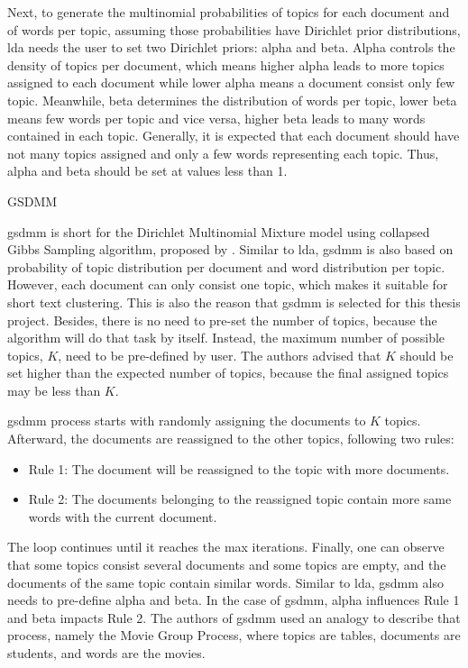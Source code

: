 \documentclass[a4paper,man,floatsintext,natbib,noextraspace]{apa6}
\makeatletter
\renewcommand{\subsubsection}{\@startsection{subsubsection}{3}
  {\z@}
  {\b@level@two@skip}
  {\e@level@two@skip}
  {\normalfont\normalsize\bfseries\itshape}}
\makeatother
\begin{document}
Next, to generate the multinomial probabilities of topics for each document and of words per topic, assuming those probabilities have Dirichlet prior distributions, \gls{lda} needs the user to set two Dirichlet priors: alpha and beta. Alpha controls the density of topics per document, which means higher alpha leads to more topics assigned to each document while lower alpha means a document consist only few topic. Meanwhile, beta determines the distribution of words per topic, lower beta means few words per topic and vice versa, higher beta leads to many words contained in each topic. Generally, it is expected that each document should have not many topics assigned and only a few words representing each topic. Thus, alpha and beta should be set at values less than 1. 

\subsubsection{GSDMM}

\gls{gsdmm} is short for the Dirichlet Multinomial Mixture model using collapsed Gibbs Sampling algorithm, proposed by \cite{yinDirichletMultinomialMixture2014}. Similar to \gls{lda}, \gls{gsdmm} is also based on probability of topic distribution per document and word distribution per topic. However, each document can only consist one topic, which makes it suitable for short text clustering. This is also the reason that \gls{gsdmm} is selected for this thesis project. Besides, there is no need to pre-set the number of topics, because the algorithm will do that task by itself. Instead, the maximum number of possible topics, $K$, need to be pre-defined by user. The authors advised that $K$ should be set higher than the expected number of topics, because the final assigned topics may be less than $K$.

\gls{gsdmm} process starts with randomly assigning the documents to $K$ topics. Afterward, the documents are reassigned to the other topics, following two rules:

\begin{itemize}
    \item Rule 1: The document will be reassigned to the topic with more documents.
    \item Rule 2: The documents belonging to the reassigned topic contain more same words with the current document.
\end{itemize}

The loop continues until it reaches the max iterations. Finally, one can observe that some topics consist several documents and some topics are empty, and the documents of the same topic contain similar words. Similar to \gls{lda}, \gls{gsdmm} also needs to pre-define alpha and beta. In the case of \gls{gsdmm}, alpha influences Rule 1 and beta impacts Rule 2. The authors of \gls{gsdmm} used an analogy to describe that process, namely the Movie Group Process, where topics are tables, documents are students, and words are the movies. 
\end{document}
